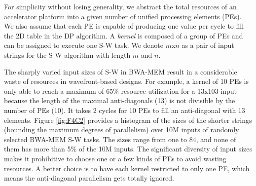 For simplicity without losing generality, 
we abstract the total resources of an accelerator platform into a given number of unified processing elements (PEs). 
We also assume that each PE is capable of producing one value per cycle to fill the 2D table in the DP algorithm. 
A \textit{kernel} is composed of a group of PEs and can be assigned to execute one S-W task.
We denote $m$x$n$ as a pair of input strings for the S-W algorithm with length $m$ and $n$. 

The sharply varied input sizes of S-W in BWA-MEM result in a considerable waste of resources in wavefront-based designs. 
For example, a kernel of 10 PEs is only able to reach a maximum of 65\% resource utilization for a 13x103 input because the length of the maximal anti-diagonals (13) is not divisible by the number of PEs (10). It takes 2 cycles for 10 PEs to fill an anti-diagonal with 13 elements.
Figure \ref{fig:F4C2} provides a histogram of the sizes of the shorter strings (bounding the maximum degrees of parallelism) over 10M inputs of randomly selected BWA-MEM S-W tasks. 
The sizes range from one to 84, and none of them has more than 5\% of the 10M inputs. 
The significant diversity of input sizes makes it prohibitive to choose one or a few kinds of PEs to avoid wasting resources.
A better choice is to have each kernel restricted to only one PE, which means the anti-diagonal parallelism gets totally ignored.

